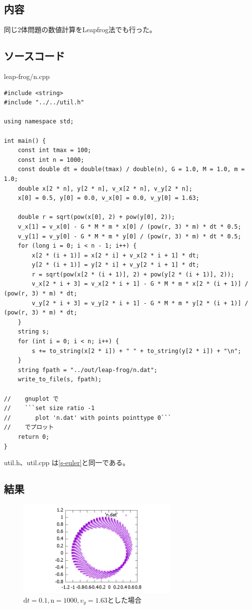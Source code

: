 \documentclass[a4paper,twoside]{jarticle}
\begin{document}
\subsection{内容}
同じ2体問題の数値計算をLeapfrog法でも行った。

\subsection{ソースコード}
leap-frog/n.cpp
\begin{lstlisting}
#include <string>
#include "../../util.h"

using namespace std;

int main() {
    const int tmax = 100;
    const int n = 1000;
    const double dt = double(tmax) / double(n), G = 1.0, M = 1.0, m = 1.0;
    double x[2 * n], y[2 * n], v_x[2 * n], v_y[2 * n];
    x[0] = 0.5, y[0] = 0.0, v_x[0] = 0.0, v_y[0] = 1.63;

    double r = sqrt(pow(x[0], 2) + pow(y[0], 2));
    v_x[1] = v_x[0] - G * M * m * x[0] / (pow(r, 3) * m) * dt * 0.5;
    v_y[1] = v_y[0] - G * M * m * y[0] / (pow(r, 3) * m) * dt * 0.5;
    for (long i = 0; i < n - 1; i++) {
        x[2 * (i + 1)] = x[2 * i] + v_x[2 * i + 1] * dt;
        y[2 * (i + 1)] = y[2 * i] + v_y[2 * i + 1] * dt;
        r = sqrt(pow(x[2 * (i + 1)], 2) + pow(y[2 * (i + 1)], 2));
        v_x[2 * i + 3] = v_x[2 * i + 1] - G * M * m * x[2 * (i + 1)] / (pow(r, 3) * m) * dt;
        v_y[2 * i + 3] = v_y[2 * i + 1] - G * M * m * y[2 * (i + 1)] / (pow(r, 3) * m) * dt;
    }
    string s;
    for (int i = 0; i < n; i++) {
        s += to_string(x[2 * i]) + " " + to_string(y[2 * i]) + "\n";
    }
    string fpath = "../out/leap-frog/n.dat";
    write_to_file(s, fpath);

//    gnuplot で
//    ```set size ratio -1
//       plot 'n.dat' with points pointtype 0```
//    でプロット
    return 0;
}
\end{lstlisting}

util.h、util.cpp は\ref{s-euler}と同一である。

\subsection{結果}
\begin{figure}[H]
\begin{center}
\includegraphics[width=8cm]{../cpp/out/leap-frog/n.png}
\end{center}
\caption{$\mathrm{d}t=0.1, \mathrm{n}=1000, v_y=1.63$とした場合}
\end{figure}
\end{document}
